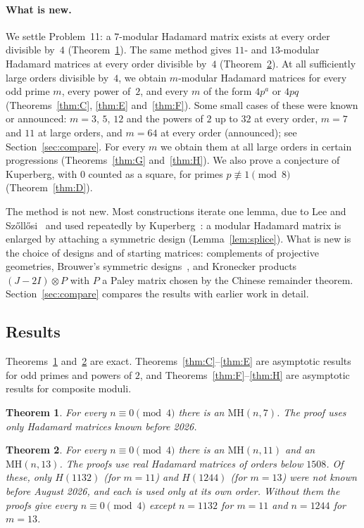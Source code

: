 \documentclass[10pt]{article}
\newtheorem{theorem}{Theorem}
\theoremstyle{remark}
\newcommand{\MH}{\mathrm{MH}}
\begin{document}
\paragraph{What is new.}
We settle Problem~11: a $7$-modular Hadamard matrix exists at every order divisible by~$4$ (Theorem~\ref{thm:A}). The same method gives $11$- and $13$-modular Hadamard matrices at every order divisible by~$4$ (Theorem~\ref{thm:B}). At all sufficiently large orders divisible by~$4$, we obtain $m$-modular Hadamard matrices for every odd prime $m$, every power of~$2$, and every $m$ of the form $4p^a$ or $4pq$ (Theorems~\ref{thm:C}, \ref{thm:E} and~\ref{thm:F}). Some small cases of these were known or announced: $m=3$, $5$, $12$ and the powers of $2$ up to $32$ at every order, $m=7$ and $11$ at large orders, and $m=64$ at every order (announced); see Section~\ref{sec:compare}. For every $m$ we obtain them at all large orders in certain progressions (Theorems~\ref{thm:G} and~\ref{thm:H}). We also prove a conjecture of Kuperberg, with $0$ counted as a square, for primes $p\not\equiv1\pmod8$ (Theorem~\ref{thm:D}).

The method is not new. Most constructions iterate one lemma, due to Lee and Sz\H{o}ll\H{o}si~\cite[Lemma~3.6]{LS} and used repeatedly by Kuperberg~\cite[Lemmas~3.5, 4.4]{K}: a modular Hadamard matrix is enlarged by attaching a symmetric design (Lemma~\ref{lem:splice}). What is new is the choice of designs and of starting matrices: complements of projective geometries, Brouwer's symmetric designs~\cite{Br83}, and Kronecker products $(J-2I)\otimes P$ with $P$ a Paley matrix chosen by the Chinese remainder theorem. Section~\ref{sec:compare} compares the results with earlier work in detail.

\subsection{Results}
Theorems~\ref{thm:A} and~\ref{thm:B} are exact. Theorems~\ref{thm:C}--\ref{thm:E} are asymptotic results for odd primes and powers of $2$, and Theorems~\ref{thm:F}--\ref{thm:H} are asymptotic results for composite moduli.
\begin{theorem}\label{thm:A}
For every $n\equiv0\pmod4$ there is an $\MH(n,7)$. The proof uses only Hadamard matrices known before 2026.
\end{theorem}

\begin{theorem}\label{thm:B}
For every $n\equiv0\pmod4$ there is an $\MH(n,11)$ and an $\MH(n,13)$. The proofs use real Hadamard matrices of orders below $1508$. Of these, only $H(1132)$ (for $m=11$) and $H(1244)$ (for $m=13$) were not known before August 2026, and each is used only at its own order. Without them the proofs give every $n\equiv0\pmod4$ except $n=1132$ for $m=11$ and $n=1244$ for $m=13$.
\end{theorem}
\end{document}
